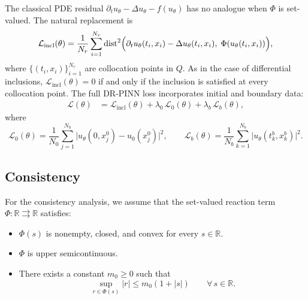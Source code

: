 \documentclass[11pt]{elsarticle}
\theoremstyle{definition}
\theoremstyle{remark}
\numberwithin{equation}{section}
\def\dist{\operatorname{dist}}
\begin{document}
	The classical PDE residual $\partial_t u_\theta-\Delta u_\theta-f(u_\theta)$
	has no analogue when $\Phi$ is set-valued.  The natural replacement is
	\begin{equation}\label{eq:pde-distance-loss}
		\mathcal{L}_{\mathrm{incl}}(\theta)
		=
		\frac{1}{N_r}
		\sum_{i=1}^{N_r}
		\dist^2\Bigl(
		\partial_t u_\theta(t_i,x_i)-\Delta u_\theta(t_i,x_i),\;
		\Phi(u_\theta(t_i,x_i))
		\Bigr),
	\end{equation}
	where $\{(t_i,x_i)\}_{i=1}^{N_r}$ are collocation points in $Q$.  As in
	the case of differential inclusions, $\mathcal{L}_{\mathrm{incl}}(\theta)=0$ if and only if the
	inclusion is satisfied at every collocation point.  The full DR-PINN loss
	incorporates initial and boundary data:
	\begin{align*}
		\mathcal{L}(\theta)
		&=
		\mathcal{L}_{\mathrm{incl}}(\theta)
		+
		\lambda_0\,\mathcal{L}_0(\theta)
		+
		\lambda_b\,\mathcal{L}_b(\theta),
	\end{align*}
	where
	\[
	\mathcal{L}_0(\theta)
	=
	\frac{1}{N_0}\sum_{j=1}^{N_0}\bigl|u_\theta(0,x_j^0)-u_0(x_j^0)\bigr|^2,
	\qquad
	\mathcal{L}_b(\theta)
	=
	\frac{1}{N_b}\sum_{k=1}^{N_b}\bigl|u_\theta(t_k^b,x_k^b)\bigr|^2.
	\]
	
	\subsection{Consistency}
	\label{sec:pde-consistency}
	For the consistency analysis, we assume that the set-valued reaction term
	$\Phi:\mathbb{R}\rightrightarrows\mathbb{R}$ satisfies:
	
	\begin{itemize}
		\item[(P1)] $\Phi(s)$ is nonempty, closed, and convex for every
		$s\in\mathbb{R}$.
		
		\item[(P2)] $\Phi$ is upper semicontinuous.
		
		\item[(P3)] There exists a constant $m_0\geq 0$ such that
		\[
		\sup_{r\in\Phi(s)} |r|
		\leq m_0(1+|s|)
		\qquad\forall\,s\in\mathbb{R}.
		\]
	\end{itemize}

\end{document}
